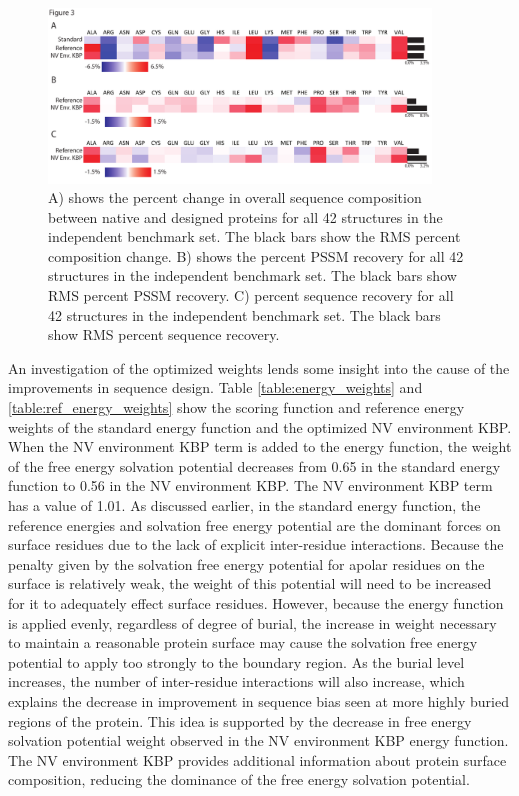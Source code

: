 \begin{figure}
\centering
\includegraphics[width=4in]{figures/nv_kbp/overall_independent_changes}
\caption{
A) shows the percent change in overall sequence composition between native and designed proteins for all 42 structures in the independent benchmark set.
The black bars show the RMS percent composition change. 
B) shows the percent PSSM recovery for all 42 structures in the independent benchmark set.
The black bars show RMS percent PSSM recovery.  
C) percent sequence recovery for all 42 structures in the independent benchmark set.
The black bars show RMS percent sequence recovery.
}
\label{fig:overall_independent_changes}
\end{figure}
 
An investigation of the optimized weights lends some insight into the cause of the improvements in sequence design.
 Table \ref{table:energy_weights} and \ref{table:ref_energy_weights} show the scoring function and reference energy weights of the standard energy function and the optimized NV environment KBP.
When the NV environment KBP term is added to the energy function, the weight of the free energy solvation potential decreases from 0.65 in the standard energy function to 0.56 in the NV environment KBP. 
The NV environment KBP term has a value of 1.01.
As discussed earlier, in the standard energy function, the reference energies and solvation free energy potential are the dominant forces on surface residues due to the lack of explicit inter-residue interactions.
Because the penalty given by the solvation free energy potential for apolar residues on the surface is relatively weak, the weight of this potential will need to be increased for it to adequately effect surface residues.
However, because the energy function is applied evenly, regardless of degree of burial, the increase in weight necessary to maintain a reasonable protein surface may cause the solvation free energy potential to apply too strongly to the boundary region.
As the burial level increases, the number of inter-residue interactions will also increase, which explains the decrease in improvement in sequence bias seen at more highly buried regions of the protein.
This idea is supported by the decrease in free energy solvation potential weight observed in the NV environment KBP energy function.
The NV environment KBP provides additional information about protein surface composition, reducing the dominance of the free energy solvation potential.

